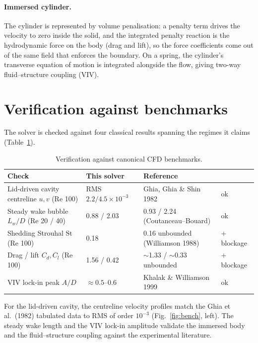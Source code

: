 \documentclass[11pt,a4paper]{article}
\begin{document}
\paragraph{Immersed cylinder.} The cylinder is represented by volume penalisation: a penalty term
drives the velocity to zero inside the solid, and the integrated penalty reaction is the
hydrodynamic force on the body (drag and lift), so the force coefficients come out of the same
field that enforces the boundary. On a spring, the cylinder's transverse equation of motion is
integrated alongside the flow, giving two-way fluid--structure coupling (VIV).

\section{Verification against benchmarks}
The solver is checked against four classical results spanning the regimes it claims
(Table~\ref{tab:verify}).

\begin{table}[h]
  \centering
  \caption{Verification against canonical CFD benchmarks.}
  \label{tab:verify}
  \footnotesize
  \setlength{\tabcolsep}{4pt}
  \begin{tabular}{@{}llll@{}}
    \toprule
    Check & This solver & Reference & \\
    \midrule
    Lid-driven cavity centreline $u,v$ (Re 100) & RMS $2.2/4.5\times10^{-3}$ & Ghia, Ghia \& Shin 1982 & ok \\
    Steady wake bubble $L_w/D$ (Re 20 / 40)      & 0.88 / 2.03               & 0.93 / 2.24 (Coutanceau--Bouard) & ok \\
    Shedding Strouhal $\mathrm{St}$ (Re 100)     & 0.18                      & 0.16 unbounded (Williamson 1988) & $+$ blockage \\
    Drag / lift $C_d,C_l$ (Re 100)               & 1.56 / 0.42               & $\sim$1.33 / $\sim$0.33 unbounded & $+$ blockage \\
    VIV lock-in peak $A/D$                        & $\approx 0.5$--$0.6$      & Khalak \& Williamson 1999 & ok \\
    \bottomrule
  \end{tabular}
\end{table}

For the lid-driven cavity, the centreline velocity profiles match the
Ghia et al.\ (1982) tabulated data to RMS of order $10^{-3}$ (Fig.~\ref{fig:bench}, left). The steady wake length and the VIV
lock-in amplitude validate the immersed body and the fluid--structure coupling against the
experimental literature.
\end{document}
